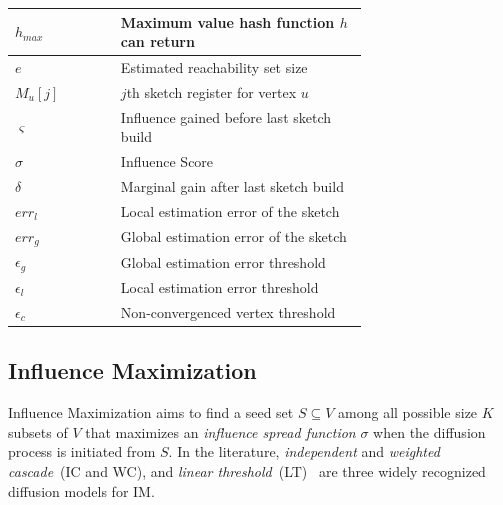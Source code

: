 \documentclass[review]{elsarticle}
\begin{document}
\begin{table}[!ht]
\begin{small}
\begin{tabular}{|l|p{0.7\linewidth}|}
        $h_{max}$       & Maximum value hash function $h$ can return\\
        \hline\hline
        $e$             & Estimated reachability set size\\
        $M_u[j]$        & $j$th sketch register for vertex $u$\\
        $\varsigma $    & Influence gained before last sketch build\\
        $\sigma $       & Influence Score\\
        $\delta$        & Marginal gain after last sketch build\\
        $err_l$         & Local estimation error of the sketch\\
        $err_g$         & Global estimation error of the sketch\\
        $\epsilon_{g}$    & Global estimation error threshold\\
        $\epsilon_{l}$    & Local estimation error threshold\\ 
        $\epsilon_{c}$    & Non-convergenced vertex threshold\\
        \hline         
    \end{tabular}
    \end{small}
\end{table}
\FloatBarrier
\subsection{Influence Maximization}

Influence Maximization aims to find a seed set $S \subseteq V$ among all possible size $K$ subsets of $V$ that maximizes an {\em influence spread function} $\sigma$  when the diffusion process is initiated from $S$. %
In the literature, {\em independent} and {\em weighted cascade}~(IC and WC), and 
{\em linear threshold}~(LT)~\cite{kempe2003maximizing} are three widely recognized diffusion models for IM. 
\end{document}
